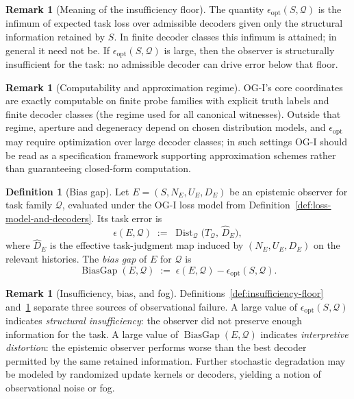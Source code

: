 \documentclass[11pt,twoside]{article}
\theoremstyle{definition}
\newtheorem{definition}[theorem]{Definition}
\newtheorem{remark}[theorem]{Remark}
\DeclareMathOperator{\BiasGap}{BiasGap}
\DeclareMathOperator{\Dist}{Dist}
\begin{document}
\begin{remark}[Meaning of the insufficiency floor]
\label{rem:meaning-insufficiency-floor}
The quantity \(\epsilon_{\mathrm{opt}}(S,\mathcal{Q})\) is the infimum of expected task loss over admissible decoders given only the structural information retained by \(S\). In finite decoder classes this infimum is attained; in general it need not be. If \(\epsilon_{\mathrm{opt}}(S,\mathcal{Q})\) is large, then the observer is structurally insufficient for the task: no admissible decoder can drive error below that floor.
\end{remark}

\begin{remark}[Computability and approximation regime]
\label{rem:computability-regime}
OG-I's core coordinates are exactly computable on finite probe families with explicit truth labels and finite decoder classes (the regime used for all canonical witnesses). Outside that regime, aperture and degeneracy depend on chosen distribution models, and \(\epsilon_{\mathrm{opt}}\) may require optimization over large decoder classes; in such settings OG-I should be read as a specification framework supporting approximation schemes rather than guaranteeing closed-form computation.
\end{remark}

\begin{definition}[Bias gap]
\label{def:bias-gap}
Let \(E=(S,N_E,U_E,D_E)\) be an epistemic observer for task family \(\mathcal{Q}\), evaluated under the OG-I loss model from Definition~\ref{def:loss-model-and-decoders}. Its task error is
\[
  \epsilon(E,\mathcal{Q})
  \;:=\;
  \Dist_{\mathcal{Q}}\!\bigl(T_{\mathcal{Q}},\, \widehat{D}_E\bigr),
\]
where \(\widehat{D}_E\) is the effective task-judgment map induced by \((N_E,U_E,D_E)\) on the relevant histories. The \emph{bias gap} of \(E\) for \(\mathcal{Q}\) is
\[
  \BiasGap(E,\mathcal{Q})
  \;:=\;
  \epsilon(E,\mathcal{Q}) - \epsilon_{\mathrm{opt}}(S,\mathcal{Q}).
\]
\end{definition}

\begin{remark}[Insufficiency, bias, and fog]
\label{rem:insuff-bias-fog}
Definitions~\ref{def:insufficiency-floor} and~\ref{def:bias-gap} separate three sources of observational failure. A large value of \(\epsilon_{\mathrm{opt}}(S,\mathcal{Q})\) indicates \emph{structural insufficiency}: the observer did not preserve enough information for the task. A large value of \(\BiasGap(E,\mathcal{Q})\) indicates \emph{interpretive distortion}: the epistemic observer performs worse than the best decoder permitted by the same retained information. Further stochastic degradation may be modeled by randomized update kernels or decoders, yielding a notion of observational noise or fog.
\end{remark}
\end{document}
